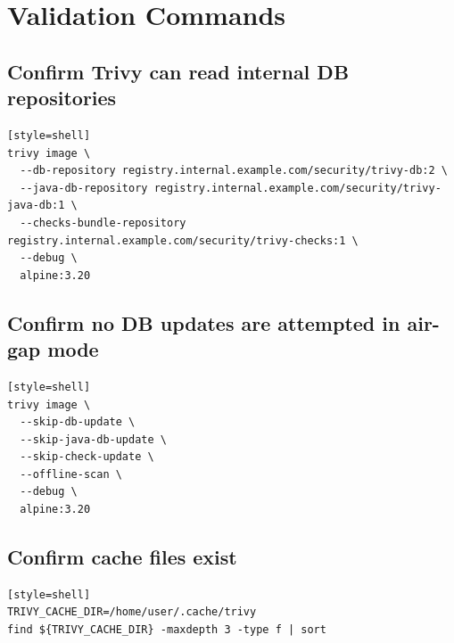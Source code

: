 \documentclass[10pt]{article}
\begin{document}
\section{Validation Commands}
\subsection{Confirm Trivy can read internal DB repositories}
\begin{verbatim}[style=shell]
trivy image \
  --db-repository registry.internal.example.com/security/trivy-db:2 \
  --java-db-repository registry.internal.example.com/security/trivy-java-db:1 \
  --checks-bundle-repository registry.internal.example.com/security/trivy-checks:1 \
  --debug \
  alpine:3.20
\end{verbatim}

\subsection{Confirm no DB updates are attempted in air-gap mode}
\begin{verbatim}[style=shell]
trivy image \
  --skip-db-update \
  --skip-java-db-update \
  --skip-check-update \
  --offline-scan \
  --debug \
  alpine:3.20
\end{verbatim}

\subsection{Confirm cache files exist}
\begin{verbatim}[style=shell]
TRIVY_CACHE_DIR=/home/user/.cache/trivy
find ${TRIVY_CACHE_DIR} -maxdepth 3 -type f | sort
\end{verbatim}
\end{document}
